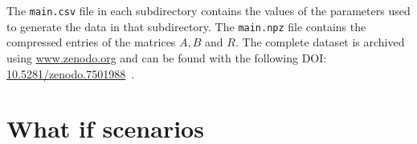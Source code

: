 The \lstinline{main.csv} file in each subdirectory contains the values of the
parameters used to generate the data in that subdirectory.
The \lstinline{main.npz} file contains the compressed entries of the matrices
\(A, B\) and \(R\).
The complete dataset is archived using \url{www.zenodo.org} and can be found
with the following DOI:
\url{10.5281/zenodo.7501988}~\cite{michalis_panayides_2023_7501988}.



\section{What if scenarios}\label{sec:results_what_if}


